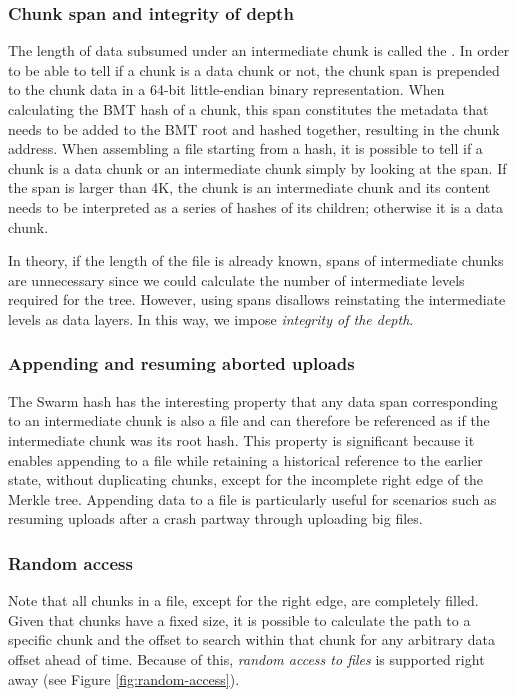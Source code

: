  \subsubsection{Chunk span and integrity of depth}

The length of data subsumed under an intermediate chunk is called the . In order to be able to tell if a chunk is a data chunk or not, the chunk span is prepended to the chunk data in a 64-bit little-endian binary representation. When calculating the BMT hash of a chunk, this span constitutes the metadata that needs to be added to the BMT root and hashed together, resulting in the chunk address. When assembling a file starting from a hash, it is possible to tell if a chunk is a data chunk or an intermediate chunk simply by looking at the span. If the span is larger than 4K, the chunk is an intermediate chunk and its content needs to be interpreted as a series of hashes of its children; otherwise it is a data chunk.

In theory, if the length of the file is already known, spans of intermediate chunks are unnecessary since we could calculate the number of intermediate levels required for the tree. However, using spans disallows reinstating the intermediate levels as data layers. In this way, we impose \emph{integrity of the depth}. 

\subsubsection{Appending and resuming aborted uploads}

The Swarm hash has the interesting property that any data span corresponding to an intermediate chunk is also a file and can therefore be referenced as if the intermediate chunk was its root hash. This property is significant because it enables appending to a file while retaining a historical reference to the earlier state, without duplicating chunks, except for the incomplete right edge of the Merkle tree. Appending data to a file is particularly useful for scenarios such as resuming uploads after a crash partway through uploading big files.

\subsubsection{Random access}

Note that all chunks in a file, except for the right edge, are completely filled. Given that chunks have a fixed size, it is possible to calculate the path to a specific chunk and the offset to search within that chunk for any arbitrary data offset ahead of time. Because of this, \emph{random access to files} is supported right away (see Figure \ref{fig:random-access}).


